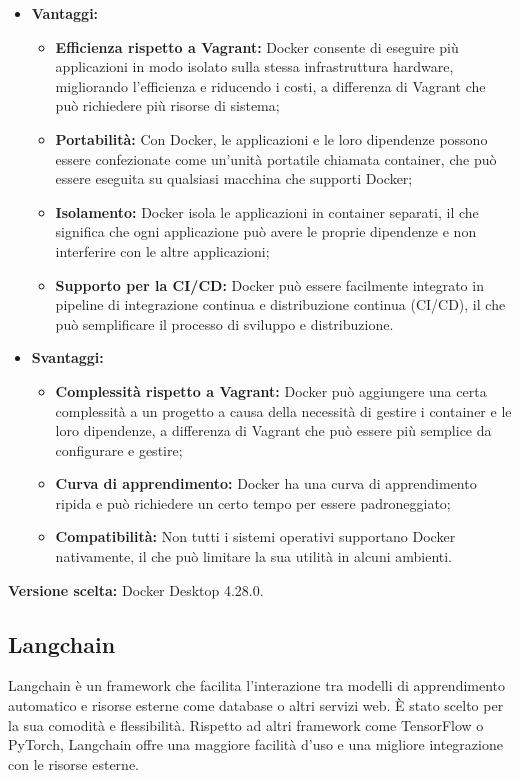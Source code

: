 \documentclass[10pt, a4paper]{article}
\begin{document}
\begin{itemize}
\item \textbf{Vantaggi:}
\begin{itemize}
\item \textbf{Efficienza rispetto a Vagrant:} Docker consente di eseguire più applicazioni in modo isolato sulla stessa infrastruttura hardware, migliorando l'efficienza e riducendo i costi, a differenza di Vagrant che può richiedere più risorse di sistema;
\item \textbf{Portabilità:} Con Docker, le applicazioni e le loro dipendenze possono essere confezionate come un'unità portatile chiamata container, che può essere eseguita su qualsiasi macchina che supporti Docker;
\item \textbf{Isolamento:} Docker isola le applicazioni in container separati, il che significa che ogni applicazione può avere le proprie dipendenze e non interferire con le altre applicazioni;
\item \textbf{Supporto per la CI/CD:} Docker può essere facilmente integrato in pipeline di integrazione continua e distribuzione continua (CI/CD), il che può semplificare il processo di sviluppo e distribuzione.
\end{itemize}
\item \textbf{Svantaggi:}
\begin{itemize}
\item \textbf{Complessità rispetto a Vagrant:} Docker può aggiungere una certa complessità a un progetto a causa della necessità di gestire i container e le loro dipendenze, a differenza di Vagrant che può essere più semplice da configurare e gestire;
\item \textbf{Curva di apprendimento:} Docker ha una curva di apprendimento ripida e può richiedere un certo tempo per essere padroneggiato;
\item \textbf{Compatibilità:} Non tutti i sistemi operativi supportano Docker nativamente, il che può limitare la sua utilità in alcuni ambienti.
\end{itemize}
\end{itemize}
\textbf{Versione scelta:} Docker Desktop 4.28.0.

\subsection{Langchain}
Langchain è un framework che facilita l'interazione tra modelli di apprendimento automatico e risorse esterne come database o altri servizi web. È stato scelto per la sua comodità e flessibilità. Rispetto ad altri framework come TensorFlow o PyTorch, Langchain offre una maggiore facilità d'uso e una migliore integrazione con le risorse esterne.
\end{document}
